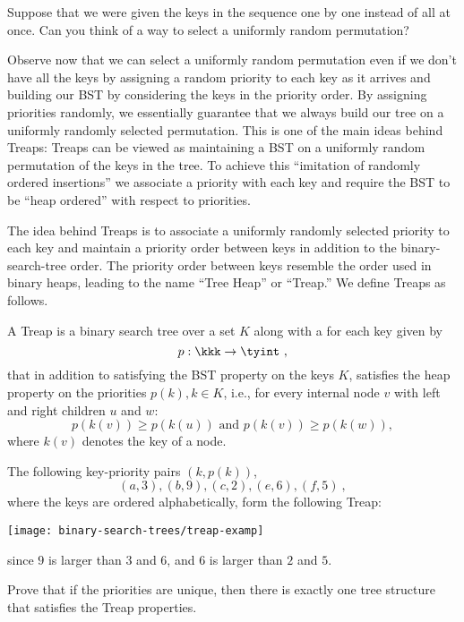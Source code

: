 \begin{chapter}
\begin{notesonly}
\begin{question}
Suppose that we were given the keys in the sequence one by one instead
of all at once.  Can you think of a way to select a uniformly random
permutation?
\end{question}

Observe now that we can select a uniformly random permutation even if
we don't have all the keys by assigning a random priority to each key
as it arrives and building our BST by considering the keys in the
priority order.  By assigning priorities randomly, we essentially
guarantee that we always build our tree on a uniformly randomly
selected permutation.
%
This is one of the main ideas behind Treaps: Treaps can be viewed as
maintaining a BST on a uniformly random permutation of the keys in the
tree. To achieve this ``imitation of randomly ordered insertions''
we associate a priority with each key and require the BST to be ``heap
ordered'' with respect to priorities.
\end{notesonly}

The idea behind Treaps is to associate a uniformly randomly selected
priority to each key and maintain a priority order between keys in
addition to the binary-search-tree order.  The priority order between
keys resemble the order used in binary heaps, leading to the name
``Tree Heap'' or ``Treap.'' We define Treaps as follows.
%
\begin{definition}[Treap]
  A Treap is a binary search tree over a set $K$ along with a
   for each key given by \[p : \kkk \rightarrow
  \tyint~,\] that in addition to satisfying the BST property on the
  keys $K$, satisfies the heap property on the priorities $p(k), k \in
  K$, i.e., for every internal node $v$ with left and right children
  $u$ and $w$:
\[
p(k(v)) \geq p(k(u)) \mbox{ and } p(k(v)) \geq p(k(w)),
\]
where $k(v)$ denotes the key of a node.
\end{definition}

\begin{example}
The following key-priority pairs $(k,p(k))$,
\[ (a,3), (b,9), (c, 2), (e,6), (f, 5)~,\] where the keys are ordered
alphabetically, form the following Treap:
\begin{center}
  \texttt{[image: binary-search-trees/treap-examp]}
\end{center}
since $9$ is larger than $3$ and $6$, and $6$ is larger than $2$ and
$5$.
\end{example}
\begin{exercise}
Prove that if the priorities are unique, then there is exactly one tree
structure that satisfies the Treap properties.
\end{exercise}


\end{chapter}

